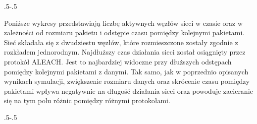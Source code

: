 \clearpage
\thispagestyle{empty}

{\pdfpagewidth
    \vspace*{-2cm}
    \noindent\kern.5\pdfpagewidth{}\kern-.5\pdfpagewidth
     \par
     \vspace*{-5cm}
\clearpage
\thispagestyle{empty}
    \vspace*{-2cm}
    \noindent\parbox{\textwidth}{%
    \noindent{}\endgraf
    \vspace{2ex}%
    }
     \par
     \vspace*{-5cm}
\clearpage
}

Poniższe wykresy przedstawiają liczbę aktywnych węzłów sieci w czasie oraz w zależności od rozmiaru pakietu i odstępie czasu pomiędzy kolejnymi pakietami. Sieć składała się z dwudziestu węzłów, które rozmieszczone zostały zgodnie z rozkładem jednorodnym.
Najdłuższy czas działania sieci został osiągnięty przez protokół ALEACH. Jest to najbardziej widoczne przy dłuższych odstępach pomiędzy kolejnymi pakietami z danymi.
Tak samo, jak w poprzednio opisanych wynikach symulacji, zwiększenie rozmiaru danych oraz skrócenie czasu pomiędzy pakietami wpływa negatywnie na długość działania sieci oraz powoduje zacieranie się na tym polu różnic pomiędzy różnymi protokołami.


\clearpage
\thispagestyle{empty}

{\pdfpagewidth
    \vspace*{-2cm}
    \noindent\kern.5\pdfpagewidth{}\kern-.5\pdfpagewidth
     \par
     \vspace*{-5cm}
\clearpage
\thispagestyle{empty}
    \vspace*{-2cm}
    \noindent\parbox{\textwidth}{%
    \noindent{}\endgraf
    \vspace{2ex}%
    }
     \par
     \vspace*{-5cm}
\clearpage
}

